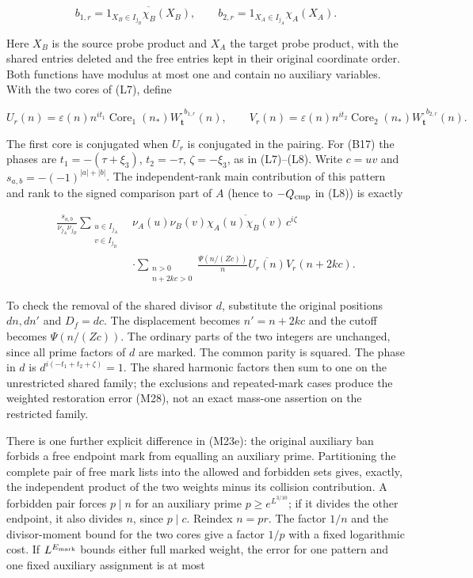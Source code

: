 \[
b_{1,r}=\overline{1_{X_B\in I_{j_B}}\chi_B(X_B)},\qquad
b_{2,r}=1_{X_A\in I_{j_A}}\chi_A(X_A).
\tag{M23c}
\]

Here \(X_B\) is the source probe product and \(X_A\) the target probe
product, with the shared entries deleted and the free entries kept in
their original coordinate order. Both functions have modulus at most one
and contain no auxiliary variables. With the two cores of (L7), define

\[
U_r(n)=\varepsilon(n)n^{it_1}\operatorname{Core}_1(n_*)
                  W_{\boldsymbol t}^{,b_{1,r}}(n),\qquad
V_r(n)=\varepsilon(n)n^{it_2}\operatorname{Core}_2(n_*)
                  W_{\boldsymbol t}^{,b_{2,r}}(n).
\tag{M23d}
\]

The first core is conjugated when \(U_r\) is conjugated in the pairing.
For (B17) the phases are \(t_1=-(\tau+\xi_3)\), \(t_2=-\tau\),
\(\zeta=-\xi_3\), as in (L7)--(L8). Write \(c=uv\) and
\(s_{a,b}=-(-1)^{|a|+|b|}\). The independent-rank main contribution of
this pattern and rank to the signed comparison part of \(A\) (hence to
\(-Q_{\rm cmp}\) in (L8)) is exactly

\[
\begin{aligned}
\frac{s_{a,b}}{\nu_{j_A}\nu_{j_B}}
\sum_{\substack{u\in I_{j_A}\\v\in I_{j_B}}}
 &\nu_A(u)\nu_B(v)\overline{\chi_A(u)\chi_B(v)}\,c^{i\zeta}\\
&\cdot\sum_{\substack{n>0\\n+2kc>0}}
 \frac{\Psi(n/(Zc))}{n}\overline{U_r(n)}V_r(n+2kc).
\end{aligned}\tag{M23e}
\]

To check the removal of the shared divisor \(d\), substitute the
original positions \(dn,dn'\) and \(D_f=dc\). The displacement becomes
\(n'=n+2kc\) and the cutoff becomes \(\Psi(n/(Zc))\). The ordinary parts
of the two integers are unchanged, since all prime factors of \(d\) are
marked. The common parity is squared. The phase in \(d\) is
\(d^{i(-t_1+t_2+\zeta)}=1\). The shared harmonic factors then sum to one
on the unrestricted shared family; the exclusions and repeated-mark
cases produce the weighted restoration error (M28), not an exact
mass-one assertion on the restricted family.

There is one further explicit difference in (M23e): the original
auxiliary ban forbids a free endpoint mark from equalling an auxiliary
prime. Partitioning the complete pair of free mark lists into the
allowed and forbidden sets gives, exactly, the independent product of
the two weights minus its collision contribution. A forbidden pair
forces \(p\mid n\) for an auxiliary prime \(p\ge e^{L^{3/10}}\); if it
divides the other endpoint, it also divides \(n\), since \(p\mid c\).
Reindex \(n=pr\). The factor \(1/n\) and the divisor-moment bound for
the two cores give a factor \(1/p\) with a fixed logarithmic cost. If
\(L^{E_{\rm mark}}\) bounds either full marked weight, the error for one
pattern and one fixed auxiliary assignment is at most

